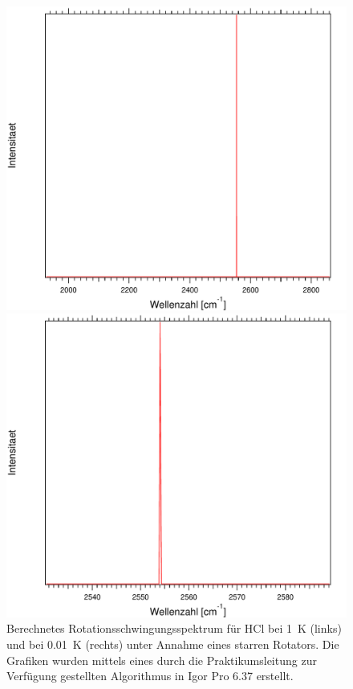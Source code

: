 \begin{figure}[H]
\centering	
	\begin{minipage}{0.47\linewidth}
	\includegraphics[width=\linewidth]{Bilder/1HCl.pdf}
	
	\end{minipage}
\begin{minipage}{0.47\linewidth}
	\includegraphics[width=\linewidth]{Bilder/001HCl.pdf}
	
	\end{minipage}
\caption{Berechnetes Rotationsschwingungsspektrum für HCl bei 1~K (links) und bei 0.01~K (rechts) unter Annahme eines starren Rotators. Die Grafiken wurden mittels eines durch die Praktikumsleitung zur Verfügung gestellten Algorithmus in Igor Pro 6.37 erstellt.}
	\label{Rot:001HCl}	
	
	
	
	
\end{figure}



